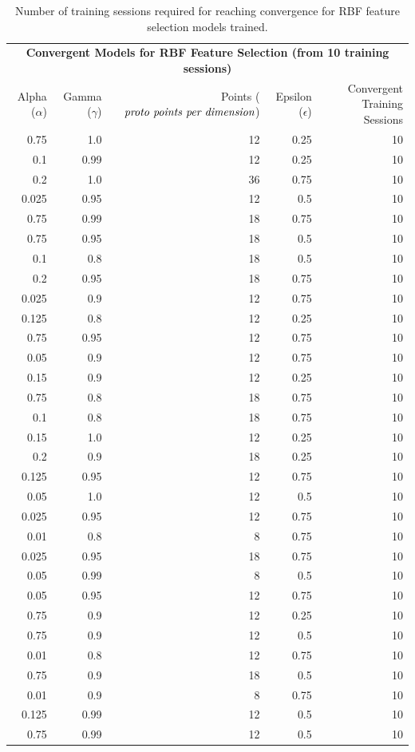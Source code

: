 \documentclass[10pt,twocolumn]{article}
\begin{document}
\begin{table}
  \centering
  \begin{tabular}{@{}rrrr|r@{}}\toprule
  \multicolumn{5}{c}{\textbf{Convergent Models for RBF Feature Selection (from 10 training sessions)}}\\
  Alpha ($\alpha$) & Gamma ($\gamma$) & Points ($\emph{proto points per dimension}$) & Epsilon ($\epsilon$) & Convergent Training Sessions\\
  0.75 & 1.0 & 12 & 0.25 & 10\\
  0.1 & 0.99 & 12 & 0.25 & 10\\
  0.2 & 1.0 & 36 & 0.75 & 10\\
  0.025 & 0.95 & 12 & 0.5 & 10\\
  0.75 & 0.99 & 18 & 0.75 & 10\\
  0.75 & 0.95 & 18 & 0.5 & 10\\
  0.1 & 0.8 & 18 & 0.5 & 10\\
  0.2 & 0.95 & 18 & 0.75 & 10\\
  0.025 & 0.9 & 12 & 0.75 & 10\\
  0.125 & 0.8 & 12 & 0.25 & 10\\
  0.75 & 0.95 & 12 & 0.75 & 10\\
  0.05 & 0.9 & 12 & 0.75 & 10\\
  0.15 & 0.9 & 12 & 0.25 & 10\\
  0.75 & 0.8 & 18 & 0.75 & 10\\
  0.1 & 0.8 & 18 & 0.75 & 10\\
  0.15 & 1.0 & 12 & 0.25 & 10\\
  0.2 & 0.9 & 18 & 0.25 & 10\\
  0.125 & 0.95 & 12 & 0.75 & 10\\
  0.05 & 1.0 & 12 & 0.5 & 10\\
  0.025 & 0.95 & 12 & 0.75 & 10\\
  0.01 & 0.8 & 8 & 0.75 & 10\\
  0.025 & 0.95 & 18 & 0.75 & 10\\
  0.05 & 0.99 & 8 & 0.5 & 10\\
  0.05 & 0.95 & 12 & 0.75 & 10\\
  0.75 & 0.9 & 12 & 0.25 & 10\\
  0.75 & 0.9 & 12 & 0.5 & 10\\
  0.01 & 0.8 & 12 & 0.75 & 10\\
  0.75 & 0.9 & 18 & 0.5 & 10\\
  0.01 & 0.9 & 8 & 0.75 & 10\\
  0.125 & 0.99 & 12 & 0.5 & 10\\
  0.75 & 0.99 & 12 & 0.5 & 10\\
  \bottomrule
  \end{tabular}
  \caption{Number of training sessions required for reaching convergence for RBF feature selection models trained.}
  \label{rbf-convergence-result}
\end{table}
\end{document}
